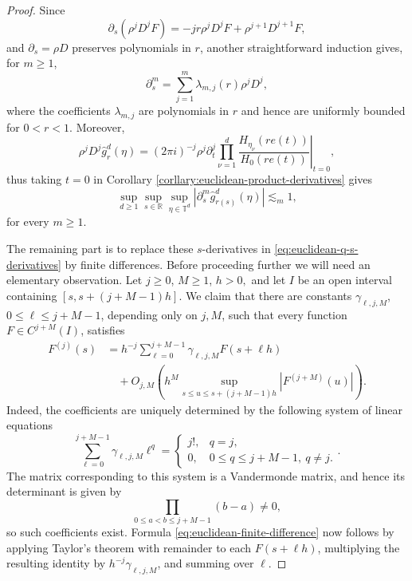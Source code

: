 \documentclass{article}
\newcommand{\R}{\mathbb R}
\theoremstyle{plain}
\numberwithin{equation}{section}
\begin{document}
\begin{proof}
Since
\[
 \partial_s(\rho^jD^jF)
 =-jr\rho^jD^jF+\rho^{j+1}D^{j+1}F,
\]
and \(\partial_s=\rho D\) preserves polynomials in \(r\),
another straightforward induction gives, for $m\geq1$,
\[
 \partial_s^m=\sum_{j=1}^m\lambda_{m,j}(r)\rho^jD^j,
\]
where the coefficients $\lambda_{m,j}$ are polynomials in \(r\) and hence are uniformly bounded for $0<r<1$.  Moreover,
\[
 \rho^jD^j\widehat g_r^d(\eta)
 =(2 \pi i)^{-j}\rho^j\left.\partial_t^j
 \prod_{\nu=1}^d\frac{H_{\eta_\nu}(re(t))}{H_0(re(t))}
 \right|_{t=0},
\]
thus
taking $t=0$ in
Corollary \ref{corllary:euclidean-product-derivatives} gives
\begin{equation}
\sup_{d\geq1}\sup_{s\in\R}\sup_{\eta\in\mathbb T^d}
 |\partial_s^m\widehat g_{r(s)}^d(\eta)|\lesssim_m 1 \label{eq:euclidean-Gaussian-s-derivatives},
\end{equation}
for every $m\geq1$.


The remaining part is to replace these \(s\)-derivatives in \eqref{eq:euclidean-q-s-derivatives} by finite differences. Before proceeding further we will need an  elementary observation.
Let $j\geq0$, $M\geq1$, $h>0,$  and let $I$ be an open interval
containing $[s,s+(j+M-1)h]$. We claim that there are constants
$\gamma_{\ell,j,M}$, $0\leq\ell\leq j+M-1$, depending only on $j,M$,
such that every function $F\in C^{j+M}(I)$, satisfies
\begin{equation}\label{eq:euclidean-finite-difference}
 \begin{aligned}
 F^{(j)}(s)
 &=h^{-j}\sum_{\ell=0}^{j+M-1}\gamma_{\ell,j,M}F(s+\ell h)\\
 &\quad+O_{j,M}\left(
 h^M\sup_{s\leq u\leq s+(j+M-1)h}|F^{(j+M)}(u)|
 \right).
 \end{aligned}
\end{equation}
Indeed, the coefficients are uniquely determined by the following system of linear equations
\[
 \sum_{\ell=0}^{j+M-1}\gamma_{\ell,j,M}\ell^q
 =
 \begin{cases}
  j!,&q=j,\\
  0,&0\leq q\leq j+M-1,\ q\ne j.
 \end{cases}.
\]
The matrix corresponding to this system is a Vandermonde matrix, and hence its determinant is given by
\[
 \prod_{0\leq a<b\leq j+M-1}(b-a)\ne0,
\]
so such coefficients exist. Formula \eqref{eq:euclidean-finite-difference} now follows by applying Taylor's theorem with remainder to each \(F(s+\ell h)\), multiplying the resulting identity by \(h^{-j}\gamma_{\ell,j,M}\), and summing over \(\ell\).




\end{proof}
\end{document}
